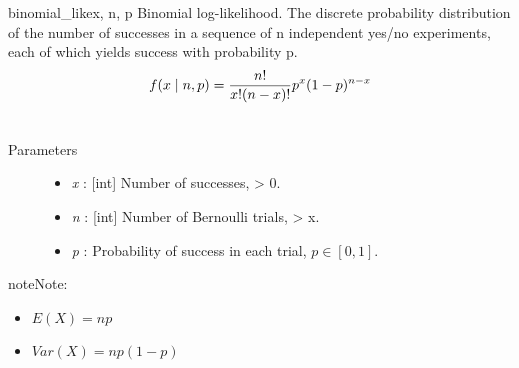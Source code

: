 \hypertarget{pymc.distributions.binomial_like}{}\begin{funcdesc}{binomial\_like}{x, n, p}
Binomial log-likelihood.  The discrete probability distribution of the
number of successes in a sequence of n independent yes/no experiments,
each of which yields success with probability p.
\begin{gather}
\begin{split}f(x \mid n, p) = \frac{n!}{x!(n-x)!} p^x (1-p)^{n-x}\end{split}\notag\\\begin{split}\end{split}\notag
\end{gather}\begin{description}
\item[Parameters] \leavevmode\begin{itemize}
\item {} 
\emph{x} : {[}int{]} Number of successes, \textgreater{} 0.

\item {} 
\emph{n} : {[}int{]} Number of Bernoulli trials, \textgreater{} x.

\item {} 
\emph{p} : Probability of success in each trial, $p \in [0,1]$.

\end{itemize}

\end{description}

\begin{notice}{note}{Note:}\begin{itemize}
\item {} 
$E(X)=np$

\item {} 
$Var(X)=np(1-p)$

\end{itemize}
\end{notice}
\end{funcdesc}

